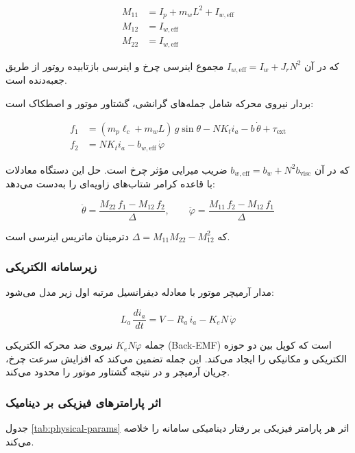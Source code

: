 \begin{align}
M_{11} &= I_p + m_w L^2 + I_{w,\text{eff}} \\
M_{12} &= I_{w,\text{eff}} \\
M_{22} &= I_{w,\text{eff}}
\end{align}

که در آن $I_{w,\text{eff}} = I_w + J_r N^2$ مجموع اینرسی چرخ و اینرسی بازتابیده روتور از طریق جعبه‌دنده است.

بردار نیروی محرکه شامل جمله‌های گرانشی، گشتاور موتور و اصطکاک است:

\begin{align}
f_1 &= (m_p \ell_c + m_w L)\,g\sin\theta - N K_t i_a - b\,\dot{\theta} + \tau_{\text{ext}} \\
f_2 &= N K_t i_a - b_{w,\text{eff}}\,\dot{\varphi}
\end{align}

که در آن $b_{w,\text{eff}} = b_w + N^2 b_{\text{visc}}$ ضریب میرایی مؤثر چرخ است. حل این دستگاه معادلات با قاعده کرامر شتاب‌های زاویه‌ای را به‌دست می‌دهد:

\begin{equation}
\ddot{\theta} = \frac{M_{22}\,f_1 - M_{12}\,f_2}{\Delta}, \qquad \ddot{\varphi} = \frac{M_{11}\,f_2 - M_{12}\,f_1}{\Delta}
\end{equation}

که $\Delta = M_{11}M_{22} - M_{12}^2$ دترمینان ماتریس اینرسی است.

\subsubsection{زیرسامانه الکتریکی}

مدار آرمیچر موتور با معادله دیفرانسیل مرتبه اول زیر مدل می‌شود:

\begin{equation}
L_a\,\frac{di_a}{dt} = V - R_a\,i_a - K_e N\,\dot{\varphi}
\end{equation}

جمله $K_e N \dot{\varphi}$ نیروی ضد محرکه الکتریکی (Back-EMF) است که کوپل بین دو حوزه الکتریکی و مکانیکی را ایجاد می‌کند. این جمله تضمین می‌کند که افزایش سرعت چرخ، جریان آرمیچر و در نتیجه گشتاور موتور را محدود می‌کند.

\subsubsection{اثر پارامترهای فیزیکی بر دینامیک}

جدول \ref{tab:physical-params} اثر هر پارامتر فیزیکی بر رفتار دینامیکی سامانه را خلاصه می‌کند.

